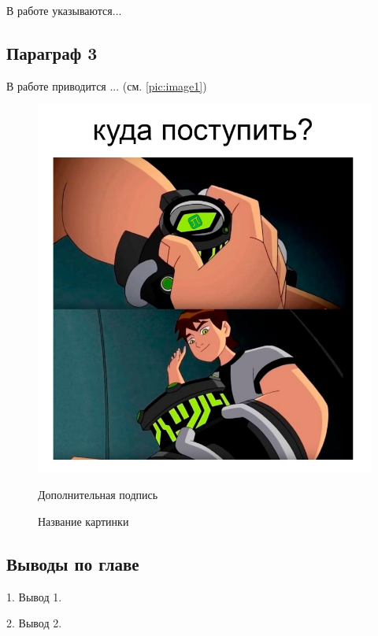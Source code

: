\documentclass[../main.tex]{subfiles}
\begin{document}
	В работе \cite{KIVITS2023} указываются...

	\subsection{Параграф 3}

	В работе \cite{Elfimova-verifInfNap} приводится ... (см. \piclabel \ref{pic:image1})


	\begin{figure}[H]
		\begin{center}
			\includegraphics[width=0.99\linewidth]{images/image1.jpg}
			\captionsetup{justification=centering}
			\caption*{Дополнительная подпись}
			\vspace{2em}
			\caption{Название картинки \cite{ГОСТ_58439-2}}
			\label{pic:GOST-scheme}
		\end{center}
	\end{figure}

	\subsection{Выводы по главе}

	1. Вывод 1.

	2. Вывод 2.
\end{document}
